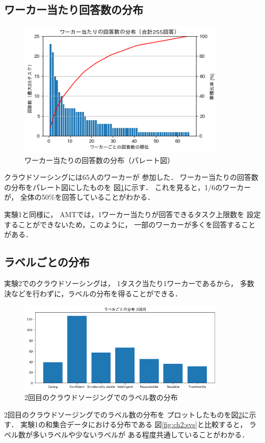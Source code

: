 \subsection{ワーカー当たり回答数の分布}
\begin{figure}[tb]
\centering
\includegraphics[width=10cm]{ch3/worker.png}
\caption{ワーカー当たりの回答数の分布（パレート図）
\label{fig:ch3:worker}}
\end{figure}
クラウドソーシングには65人のワーカーが
参加した．
ワーカー当たりの回答数の分布をパレート図にしたものを
図\ref{fig:ch3:worker}に示す．
これを見ると，1/6のワーカーが，
全体の50\%を回答していることがわかる．

実験1と同様に，
AMTでは，1ワーカー当たりが回答できるタスク上限数を
設定することができないため，このように，
一部のワーカーが多くを回答することがある．
\subsection{ラベルごとの分布}
実験2でのクラウドソーシングは，
1タスク当たり1ワーカーであるから，
多数決などを行わずに，ラベルの分布を得ることができる．

\begin{figure}[tb]
  \centering
  \includegraphics[width=10cm]{ch3/plot_label_2.png}
  \caption{2回目のクラウドソージングでのラベル数の分布
  \label{fig:ch3:label2}}
\end{figure}

2回目のクラウドソージングでのラベル数の分布を
プロットしたものを図\ref{fig:ch3:label2}に示す．
実験1の和集合データにおける分布である
図\ref{fig:ch2:svs}と比較すると，
ラベル数が多いラベルや少ないラベルが
ある程度共通していることがわかる．
